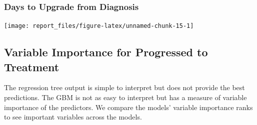 \documentclass[]{article}
\begin{document}
\hypertarget{days-to-upgrade-from-diagnosis}{%
\subsubsection{Days to Upgrade from Diagnosis}\label{days-to-upgrade-from-diagnosis}}

\begin{center}\texttt{[image: report\_files/figure-latex/unnamed-chunk-15-1]} \end{center}

\hypertarget{variable-importance-for-progressed-to-treatment}{%
\subsection{Variable Importance for Progressed to Treatment}\label{variable-importance-for-progressed-to-treatment}}

The regression tree output is simple to interpret but does not provide the best predictions.
The GBM is not as easy to interpret but has a measure of variable importance of the predictors.
We compare the models' variable importance ranks to see important variables across the models.
\end{document}
